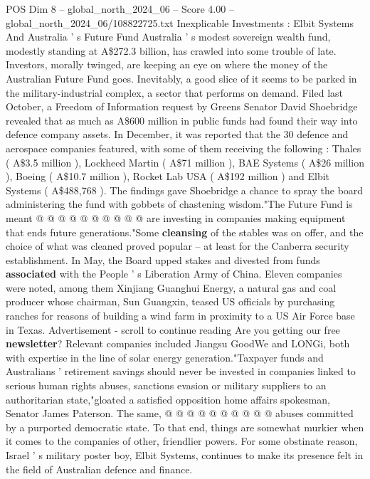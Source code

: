 \begin{textsample}{POS Dim 8 – global\_north\_2024\_06 – Score 4.00 – global\_north\_2024\_06/108822725.txt}  \label{ex:f8_pos_257}
Inexplicable Investments : Elbit Systems And Australia ' s Future Fund Australia ' s modest sovereign wealth fund, modestly standing at A\$272.3 billion, has crawled into some trouble of late.
Investors, morally twinged, are keeping an eye on where the money of the Australian Future Fund goes.
Inevitably, a good slice of it seems to be parked in the military-industrial complex, a sector that performs on demand.
Filed last October, a Freedom of Information request by Greens Senator David Shoebridge revealed that as much as A\$600 million in public funds had found their way into defence company assets.
In December, it was reported that the 30 defence and aerospace companies featured, with some of them receiving the following : Thales ( A\$3.5 million ), Lockheed Martin ( A\$71 million ), BAE Systems ( A\$26 million ), Boeing ( A\$10.7 million ), Rocket Lab USA ( A\$192 million ) and Elbit Systems ( A\$488,768 ).
The findings gave Shoebridge a chance to spray the board administering the fund with gobbets of chastening wisdom."The Future Fund is meant @ @ @ @ @ @ @ @ @ @ are investing in companies making equipment that ends future generations."Some \textbf{cleansing} of the stables was on offer, and the choice of what was cleaned proved popular -- at least for the Canberra security establishment.
In May, the Board upped stakes and divested from funds \textbf{associated} with the People ' s Liberation Army of China.
Eleven companies were noted, among them Xinjiang Guanghui Energy, a natural gas and coal producer whose chairman, Sun Guangxin, teased US officials by purchasing ranches for reasons of building a wind farm in proximity to a US Air Force base in Texas.
Advertisement - scroll to continue reading Are you getting our free \textbf{newsletter}?
Relevant companies included Jiangsu GoodWe and LONGi, both with expertise in the line of solar energy generation."Taxpayer funds and Australians ' retirement savings should never be invested in companies linked to serious human rights abuses, sanctions evasion or military suppliers to an authoritarian state,"gloated a satisfied opposition home affairs spokesman, Senator James Paterson.
The same, @ @ @ @ @ @ @ @ @ @ abuses committed by a purported democratic state.
To that end, things are somewhat murkier when it comes to the companies of other, friendlier powers.
For some obstinate reason, Israel ' s military poster boy, Elbit Systems, continues to make its presence felt in the field of Australian defence and finance.

\end{textsample}
